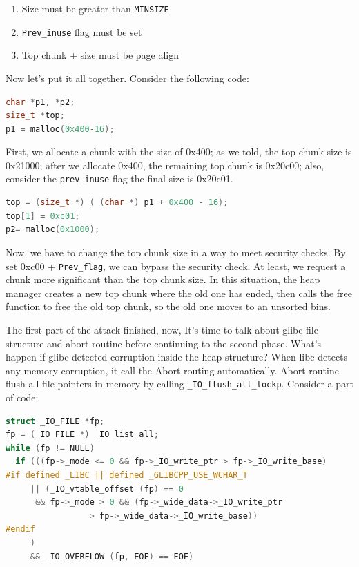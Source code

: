 \documentclass{masterthesis}
\newcommand*\libc{glibc}
\newcommand*\ub{unsorted bins}
\begin{document}
\begin{enumerate}
	\item Size must be greater than \lstinline{MINSIZE}
	\item \lstinline{Prev_inuse} flag must be set
	\item Top chunk + size must be page align
\end{enumerate}

Now let's put it all together. Consider the following code:

\begin{lstlisting}[language=c,frame=tlrb]
char *p1, *p2;
size_t *top;
p1 = malloc(0x400-16);
 \end{lstlisting}

First, we allocate a chunk with the size of 0x400; as we told, the top chunk size is 0x21000; after we allocate 0x400, the remaining top chunk is 0x20c00; also, consider the \lstinline{prev_inuse} flag the final size is 0x20c01.

\begin{lstlisting}[language=c,frame=tlrb]
top = (size_t *) ( (char *) p1 + 0x400 - 16);
top[1] = 0xc01;
p2= malloc(0x1000);
\end{lstlisting}

Now, we have to change the top chunk size in a way to meet security checks. By set 0xc00 + \lstinline{Prev_flag}, we can bypass the security check. At least, we request a chunk more significant than the top chunk size. In this situation, the heap manager creates a new top chunk where the old one has ended, then calls the free function to free the old top chunk, so the old one moves to an \ub{}.

The first part of the attack finished, now, It's time to talk about \libc{} file structure and abort routine before continuing to the second phase. What's happen if \libc{} detected corruption inside the heap structure? When libc detects any memory corruption, it call the Abort routing automatically. Abort routine flush all file pointers in memory by calling \lstinline{_IO_flush_all_lockp}. Consider a part of code:

\begin{lstlisting}[language=c,frame=tlrb]
struct _IO_FILE *fp;
fp = (_IO_FILE *) _IO_list_all;
while (fp != NULL)
  if (((fp->_mode <= 0 && fp->_IO_write_ptr > fp->_IO_write_base)
#if defined _LIBC || defined _GLIBCPP_USE_WCHAR_T
	 || (_IO_vtable_offset (fp) == 0
	  && fp->_mode > 0 && (fp->_wide_data->_IO_write_ptr
				 > fp->_wide_data->_IO_write_base))
#endif
	 )
	 && _IO_OVERFLOW (fp, EOF) == EOF)
\end{lstlisting}
\end{document}
